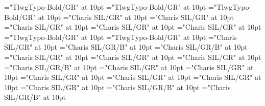 \documentclass[a4paper,twoside]{article}
\begin{document}
\font\translationLcpttranslationsexamplessensesensesentryletDatadicBody="TlwgTypo-Bold/GR" at 10pt
\font\xitempttranslationLcpttranslationsexamplessensesensesentryletDatadicBody="TlwgTypo-Bold/GR" at 10pt
\font\spanptxitempttranslationLcpttranslationsexamplessensesensesentryletDatadicBody="TlwgTypo-Bold/GR" at 10pt
\font\spanentranslationLcpttranslationsexamplessensesensesentryletDatadicBody="Charis SIL/GR" at 10pt
\font\xitementranslationLcpttranslationsexamplessensesensesentryletDatadicBody="Charis SIL/GR" at 10pt
\font\spanenxitementranslationLcpttranslationsexamplessensesensesentryletDatadicBody="Charis SIL/GR" at 10pt
\font\complexformrefsentryletDatadicBody="Charis SIL/GR" at 10pt
\font\complexformtypecomplexformrefsentryletDatadicBody="Charis SIL/GR" at 10pt
\font\LexEntryTypepublishStemComplexFormTypeReverseAbbrPubptcomplexformtypecomplexformrefsentryletDatadicBody="TlwgTypo-Bold/GR" at 10pt
\font\spanptLexEntryTypepublishStemComplexFormTypeReverseAbbrPubptcomplexformtypecomplexformrefsentryletDatadicBody="TlwgTypo-Bold/GR" at 10pt
\font\spanencomplexformtypecomplexformrefsentryletDatadicBody="Charis SIL/GR" at 10pt
\font\complexformformsehcomplexformrefsentryletDatadicBody="Charis SIL/GR/B" at 10pt
\font\spanencomplexformformsehcomplexformrefsentryletDatadicBody="Charis SIL/GR/B" at 10pt
\font\spanencomplexformrefsentryletDatadicBody="Charis SIL/GR" at 10pt
\font\xitementryrefcomponentprimaryrefsentryletDatadicBody="Charis SIL/GR" at 10pt
\font\axitementryrefcomponentprimaryrefsentryletDatadicBody="Charis SIL/GR" at 10pt
\font\LexEntrypublishStemComponentTargetHeadWordRefsehaxitementryrefcomponentprimaryrefsentryletDatadicBody="Charis SIL/GR/B" at 10pt
\font\spanenentryrefcomponentprimaryrefsentryletDatadicBody="Charis SIL/GR" at 10pt
\font\translationLcentranslationsexamplessensesensesentryletDatadicBody="Charis SIL/GR" at 10pt
\font\spanentranslationLcentranslationsexamplessensesensesentryletDatadicBody="Charis SIL/GR" at 10pt
\font\xitemrelationssensesensesentryletDatadicBody="Charis SIL/GR" at 10pt
\font\lexreftargetsxitemrelationssensesensesentryletDatadicBody="Charis SIL/GR" at 10pt
\font\alexreftargetsxitemrelationssensesensesentryletDatadicBody="Charis SIL/GR" at 10pt
\font\sensecrossrefsehalexreftargetsxitemrelationssensesensesentryletDatadicBody="Charis SIL/GR/B" at 10pt
\font\xsensexrefnumbersensecrossrefsehalexreftargetsxitemrelationssensesensesentryletDatadicBody="Charis SIL/GR/B" at 10pt
\color{black} 
\end{document}
